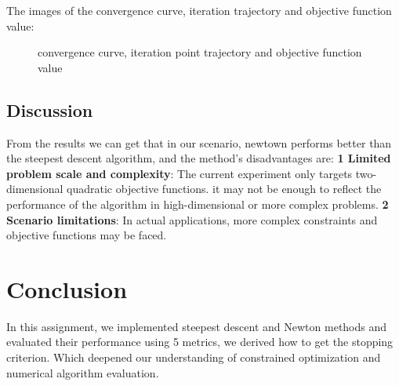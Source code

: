 \documentclass[12pt]{article}
\begin{document}
The images of the convergence curve, iteration trajectory and objective function value:\\
\begin{figure}[H]
\centering
{}
\caption[]{convergence curve, iteration point trajectory and objective function value}
\label{fig:s1}
\end{figure}

\subsection{Discussion}
From the results we can get that in our scenario, newtown performs better than the steepest descent algorithm, and the method's disadvantages are: \textbf{1 Limited problem scale and complexity}: The current experiment only targets two-dimensional quadratic objective functions. it may not be enough to reflect the performance of the algorithm in high-dimensional or more complex problems. \textbf{2 Scenario limitations}: In actual applications, more complex constraints and objective functions may be faced.
\section{Conclusion}
In this assignment, we implemented steepest descent and Newton methods and evaluated their performance using 5 metrics, we derived how to get the stopping criterion. Which deepened our understanding of constrained optimization and numerical algorithm evaluation.
\end{document}
